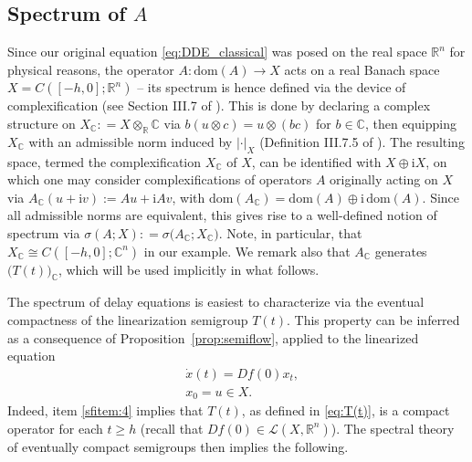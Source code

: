 \documentclass[a4paper, 12pt, oneside, reqno, notitlepage]{amsart}
\theoremstyle{plain}
\theoremstyle{definition}
\theoremstyle{remark}
\newcommand{\dom}{\mathrm{dom}}
\begin{document}
\subsection{Spectrum of \texorpdfstring{$A$}{A}}
\label{sect:spectrum}





Since our original equation \eqref{eq:DDE_classical} was posed on the real space $\mathbb{R}^n$ for physical reasons, the operator $A : \dom(A) \to X$ acts on a real Banach space $X = C([-h,0];\mathbb{R}^n)$ -- its spectrum is hence defined via the device of complexification (see Section III.7 of \cite{diekmann2012delay}).
This is done by declaring a complex structure on $X_\mathbb{C} : =X \otimes_\mathbb{R} \mathbb{C}$ via $b(u \otimes c) = u \otimes (bc)$ for $b \in \mathbb{C}$, then equipping $X_\mathbb{C}$ with an admissible norm induced by $| \cdot |_X$ (Definition III.7.5 of \cite{diekmann2012delay}).
The resulting space, termed the complexification $X_\mathbb{C}$ of $X$, can be identified with $X \oplus \mathrm{i} X$, 
on which one may consider complexifications of operators $A$ originally acting on $X$ via
$A_\mathbb{C}(u+\mathrm{i} v) := Au + \mathrm{i} A v$, with $\dom(A_\mathbb{C}) = \dom(A)\oplus \mathrm{i} \, \dom (A)$.
Since all admissible norms are equivalent, this gives rise to a well-defined notion of spectrum via $\sigma(A;X) : = \sigma\big(A_\mathbb{C}; X_\mathbb{C}\big)$.
Note, in particular, that $X_\mathbb{C} \cong C([-h,0];\mathbb{C}^n)$ in our example.
We remark also that $A_\mathbb{C}$ generates $\big(T(t)\big)_\mathbb{C}$, which will be used implicitly in what follows.


The spectrum of delay equations is easiest to characterize via the eventual compactness of the linearization semigroup $T(t)$.  
This property can be inferred as a consequence of Proposition~\ref{prop:semiflow}, applied to the linearized equation 
\begin{subequations}\label{eq:linearized_formaleq}
    \begin{align}
    &\dot{x}(t) = Df(0)x_t,   \\ 
    & x_0 = u \in X.  
    \end{align}
\end{subequations}
Indeed, item \ref{sfitem:4} implies that $T(t)$, as defined in \eqref{eq:T(t)}, is a compact operator for each $t \geq h$ (recall that $Df(0) \in \mathcal{L}(X,\mathbb{R}^n)$). 
The spectral theory of eventually compact semigroups then implies the following.
\end{document}

